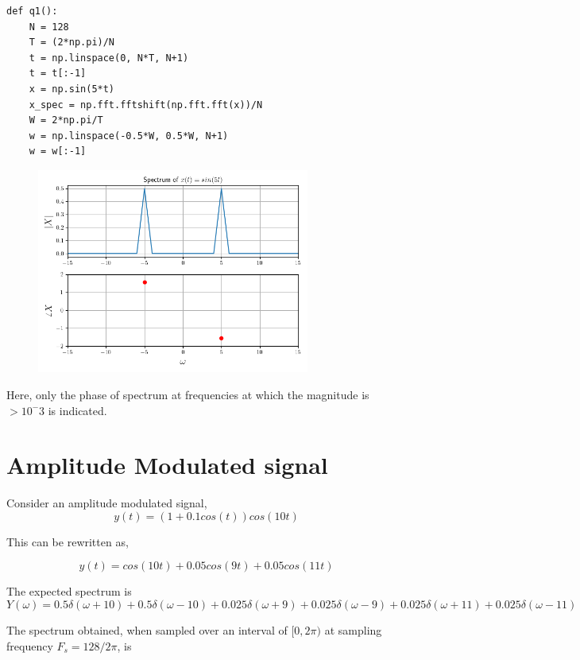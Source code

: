 \documentclass[12pt, a4paper]{article}
\begin{document}
\begin{lstlisting}
def q1():
    N = 128
    T = (2*np.pi)/N
    t = np.linspace(0, N*T, N+1)
    t = t[:-1]
    x = np.sin(5*t)
    x_spec = np.fft.fftshift(np.fft.fft(x))/N
    W = 2*np.pi/T
    w = np.linspace(-0.5*W, 0.5*W, N+1)
    w = w[:-1]
\end{lstlisting}

\begin{figure}[H]
\centering
\includegraphics[width=0.8\textwidth]{q1sin.png}
\end{figure}

Here, only the phase of spectrum at frequencies at which the magnitude is $> 10^-3$ is indicated.

\section{Amplitude Modulated signal}

Consider an amplitude modulated signal,
\begin{equation*}
y(t) = (1 + 0.1cos(t))cos(10t)
\end{equation*}

This can be rewritten as,

\begin{equation*}
y(t) = cos(10t) + 0.05cos(9t) + 0.05cos(11t)
\end{equation*}

The expected spectrum is 
\begin{equation*}
Y(\omega) = 0.5\delta(\omega+10) + 0.5\delta(\omega-10) + 0.025\delta(\omega+9) + 0.025\delta(\omega-9) + 0.025\delta(\omega+11) + 0.025\delta(\omega-11)
\end{equation*}

The spectrum obtained, when sampled over an interval of $[0, 2\pi )$ at sampling frequency $F_s = 128/2\pi $, is
\end{document}
